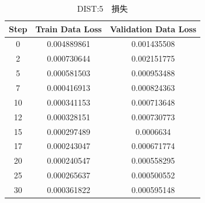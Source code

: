 \documentclass{jreport}		%
\begin{document}
\begin{table}
  \begin{center}
  \caption{DIST:5　損失}
  \begin{tabular}{c|cc} \hline
Step&Train Data Loss&Validation Data Loss \\ \hline
0&0.004889861&0.001435508 \\
2&0.000730644&0.002151775 \\
5&0.000581503&0.000953488 \\
7&0.000416913&0.000824363 \\
10&0.000341153&0.000713648 \\
12&0.000328151&0.000730773 \\
15&0.000297489&0.0006634 \\
17&0.000243047&0.000671774 \\
20&0.000240547&0.000558295 \\
25&0.000265637&0.000500552 \\
30&0.000361822&0.000595148 \\

\end{tabular}
\end{center}
\end{table}
\end{document}
